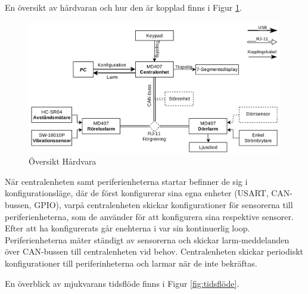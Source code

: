 \documentclass{article}
\begin{document}
En översikt av hårdvaran och hur den är kopplad finns i Figur \ref{fig:hårdvara}.
\begin{figure}[H] %
    \centering
    \includegraphics[width=1\textwidth]{figurer/HardvaraOversikt.jpg}
    \caption{Översikt Hårdvara}
    \label{fig:hårdvara}
\end{figure}

När centralenheten samt periferienheterna startar befinner de sig i konfigurationsläge, där de först konfigurerar sina egna enheter (USART, CAN-bussen, GPIO), varpå centralenheten skickar konfigurationer för sensorerna till periferienheterna, som de använder för att konfigurera sina respektive sensorer. Efter att ha konfigurerats går enehterna i var sin kontinuerlig loop. Periferienheterna mäter ständigt av sensorerna och skickar larm-meddelanden över CAN-bussen till centralenheten vid behov. Centralenheten skickar periodiskt konfigurationer till periferinheterna och larmar när de inte bekräftas.

En överblick av mjukvarans tidsflöde finns i Figur \ref{fig:tidsflöde}.
\end{document}
